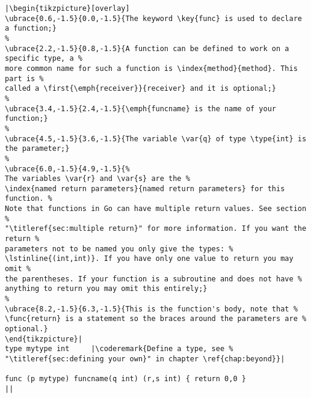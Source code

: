 \begin{lstlisting}[caption=A function declaration,label=src:function definition]
|\begin{tikzpicture}[overlay]
\ubrace{0.6,-1.5}{0.0,-1.5}{The keyword \key{func} is used to declare a function;}
%
\ubrace{2.2,-1.5}{0.8,-1.5}{A function can be defined to work on a specific type, a %
more common name for such a function is \index{method}{method}. This part is %
called a \first{\emph{receiver}}{receiver} and it is optional;}
%
\ubrace{3.4,-1.5}{2.4,-1.5}{\emph{funcname} is the name of your function;}
%
\ubrace{4.5,-1.5}{3.6,-1.5}{The variable \var{q} of type \type{int} is the parameter;}
%
\ubrace{6.0,-1.5}{4.9,-1.5}{%
The variables \var{r} and \var{s} are the %
\index{named return parameters}{named return parameters} for this function. %
Note that functions in Go can have multiple return values. See section %
"\titleref{sec:multiple return}" for more information. If you want the return %
parameters not to be named you only give the types: %
\lstinline{(int,int)}. If you have only one value to return you may omit %
the parentheses. If your function is a subroutine and does not have %
anything to return you may omit this entirely;}
%
\ubrace{8.2,-1.5}{6.3,-1.5}{This is the function's body, note that %
\func{return} is a statement so the braces around the parameters are %
optional.}
\end{tikzpicture}|
type mytype int	    |\coderemark{Define a type, see %
"\titleref{sec:defining your own}" in chapter \ref{chap:beyond}}|

func (p mytype) funcname(q int) (r,s int) { return 0,0 }
||
\end{lstlisting}
